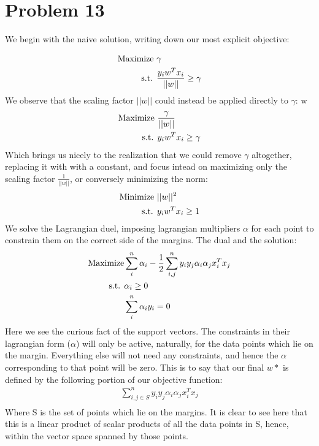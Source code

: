 \documentclass[a4paper,12pt]{article}
\begin{document}
\section*{Problem 13}
We begin with the naive solution, writing down our most explicit objective:

\begin{align*}
\text{Maximize }  &\null \gamma  \\
\text{s.t. } &\null  \frac{y_iw^Tx_i}{||w||} \geq \gamma
\end{align*}
%
We observe that the scaling factor $||w||$ could instead be applied directly to $\gamma$:
w\begin{align*}
\text{Maximize }  &\null \frac{\gamma}{||w||}  \\
\text{s.t. } &\null  y_iw^Tx_i \geq \gamma
\end{align*}
%
Which brings us nicely to the realization that we could remove $\gamma$ altogether, replacing it with with a constant, and focus intead on maximizing only the scaling factor $\frac{1}{||w||}$, or conversely minimizing the norm:
\begin{align*}
\text{Minimize }  &\null ||w||^2  \\
\text{s.t. } &\null  y_iw^Tx_i \geq 1
\end{align*}
%
We solve the Lagrangian duel, imposing lagrangian multipliers $\alpha$ for each point to constrain them on the correct side of the margins. The dual and the solution:
\begin{align*}
\text{Maximize}  &\null \sum_i^n \alpha_i - \frac{1}{2}\sum_{i,j}^n y_iy_j\alpha_i \alpha_j x_i^Tx_j\\
\text{s.t. } &\null  \alpha_i \geq 0 \\
  &\null \sum_{i}^n\alpha_iy_i = 0
\end{align*}
Here we see the curious fact of the support vectors. The constraints in their lagrangian form ($\alpha$) will only be active, naturally, for the data points which lie on the margin. Everything else will not need any constraints, and hence the $\alpha$ corresponding to that point will be zero. This is to say that our final $w*$ is defined by the following portion of our objective function:
\begin{align*}
\sum_{i,j \in S}^n y_iy_j\alpha_i \alpha_j x_i^Tx_j\\
\end{align*}
%
Where S is the set of points which lie on the margins. It is clear to see here that this is a linear product of scalar products of all the data points in S, hence, within the vector space spanned by those points.
\end{document}

